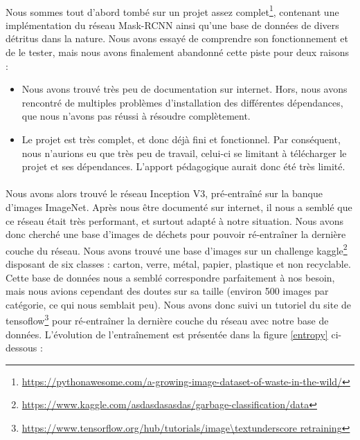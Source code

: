 \documentclass[12pt,a4paper,twocolumn]{article}
\begin{document}
\paragraph*{}

Nous sommes tout d’abord tombé sur un projet assez complet\footnote{\url{https://pythonawesome.com/a-growing-image-dataset-of-waste-in-the-wild/}}, contenant une implémentation du réseau Mask-RCNN ainsi qu’une base de données de divers détritus dans la nature. Nous avons essayé de comprendre son fonctionnement et de le tester, mais nous avons finalement abandonné cette piste pour deux raisons :

\begin{itemize}
  \item Nous avons trouvé très peu de documentation sur internet. Hors, nous avons rencontré de multiples problèmes d’installation des différentes dépendances, que nous n’avons pas réussi à résoudre complètement.
  \item Le projet est très complet, et donc déjà fini et fonctionnel. Par conséquent, nous n’aurions eu que très peu de travail, celui-ci se limitant à télécharger le projet et ses dépendances. L'apport pédagogique aurait donc été très limité.
\end{itemize}

\paragraph*{}

Nous avons alors trouvé le réseau Inception V3, pré-entraîné sur la banque d’images ImageNet. Après nous être documenté sur internet, il nous a semblé que ce réseau était très performant, et surtout adapté à notre situation.
Nous avons donc cherché une base d’images de déchets pour pouvoir ré-entraîner la dernière couche du réseau. Nous avons trouvé une base d’images sur un challenge kaggle\footnote{\url{https://www.kaggle.com/asdasdasasdas/garbage-classification/data}} disposant de six classes : carton, verre, métal, papier, plastique et non recyclable. Cette base de données nous a semblé correspondre parfaitement à nos besoin, mais nous avions cependant des doutes sur sa taille (environ 500 images par catégorie, ce qui nous semblait peu).
Nous avons donc suivi un tutoriel du site de tensoflow\footnote{\url{https://www.tensorflow.org/hub/tutorials/image\textunderscore retraining}} pour ré-entraîner la dernière couche du réseau avec notre base de données. L'évolution de l'entraînement est présentée dans la figure \ref{entropy} ci-dessous :
\end{document}
